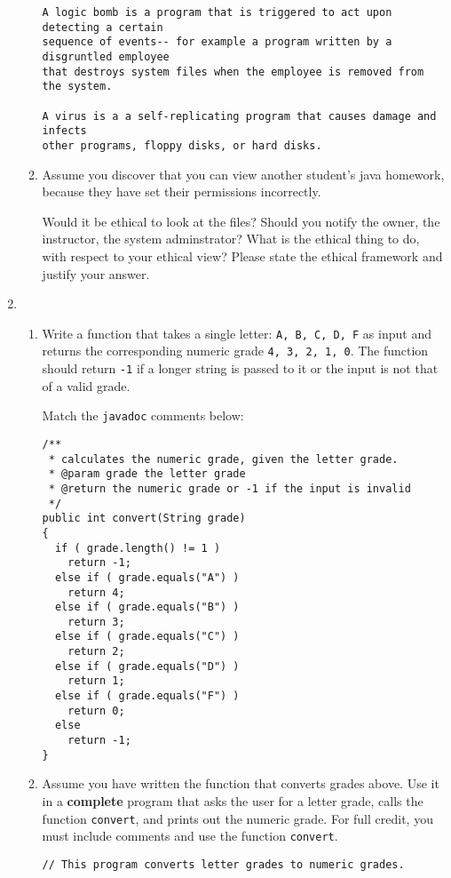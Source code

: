 \begin{enumerate}
\begin{enumerate}
\begin{verbatim}
A logic bomb is a program that is triggered to act upon detecting a certain
sequence of events-- for example a program written by a disgruntled employee
that destroys system files when the employee is removed from the system.

A virus is a a self-replicating program that causes damage and infects
other programs, floppy disks, or hard disks.
\end{verbatim}
			\item Assume you discover that you can view another
				student's java homework, because they have
				set their permissions incorrectly.  

				Would it be ethical to look at the files?
				Should you notify the owner, the instructor,
				the system adminstrator?
				What is the ethical thing to do, with
				respect to your ethical view?  Please state
				the ethical framework and justify your 
				answer.  
		\end{enumerate}

	\item 
		\begin{enumerate}
			\item Write a function that takes a single letter:
				{\tt A, B, C, D, F}
				as input and returns the corresponding
				numeric grade {\tt 4, 3, 2, 1, 0}.
				The function should return {\tt -1}
				if a longer string is passed to it or
				the input is not that of a valid grade.

				Match the {\tt javadoc} comments below:
\begin{verbatim} 
/**
 * calculates the numeric grade, given the letter grade.  
 * @param grade the letter grade 
 * @return the numeric grade or -1 if the input is invalid 
 */
public int convert(String grade) 
{
  if ( grade.length() != 1 )
    return -1;
  else if ( grade.equals("A") )
    return 4;
  else if ( grade.equals("B") )
    return 3;
  else if ( grade.equals("C") )
    return 2;
  else if ( grade.equals("D") )
    return 1;
  else if ( grade.equals("F") )
    return 0;
  else
    return -1;
}
\end{verbatim}

			\item Assume you have written the function that
				converts grades above.	Use it in a
				{\bf complete} program that asks the
				user for a letter grade, calls the
				function {\tt convert}, and prints out
				the numeric grade.  For full credit,
				you must include comments and use the
				function {\tt convert}.
\begin{verbatim}
// This program converts letter grades to numeric grades.


\end{verbatim}
\end{enumerate}
\end{enumerate}
